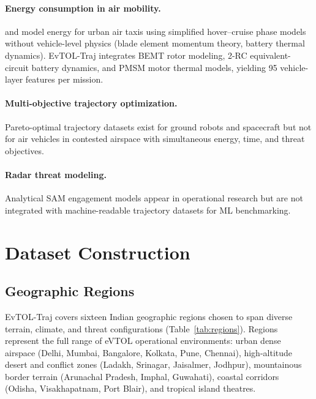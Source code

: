 \documentclass{article}
\begin{document}
\paragraph{Energy consumption in air mobility.}
\citet{rodrigues2021energy} and \citet{nakamura2023energy} model energy
for urban air taxis using simplified hover--cruise phase models without
vehicle-level physics (blade element momentum theory, battery thermal dynamics).
EvTOL-Traj integrates BEMT rotor modeling, 2-RC equivalent-circuit
battery dynamics, and PMSM motor thermal models, yielding 95 vehicle-layer
features per mission.

\paragraph{Multi-objective trajectory optimization.}
Pareto-optimal trajectory datasets exist for ground robots
\citep{gammell2015batch} and spacecraft \citep{raghavendra2021asteroid}
but not for air vehicles in contested airspace with simultaneous energy,
time, and threat objectives.

\paragraph{Radar threat modeling.}
Analytical SAM engagement models appear in operational research
\citep{bodner1994radar,skolnik2008radar} but are not integrated with
machine-readable trajectory datasets for ML benchmarking.

\section{Dataset Construction}
\label{sec:construction}

\subsection{Geographic Regions}
\label{sec:regions}

EvTOL-Traj covers sixteen Indian geographic regions chosen to span diverse
terrain, climate, and threat configurations (Table~\ref{tab:regions}).
Regions represent the full range of eVTOL operational environments: urban
dense airspace (Delhi, Mumbai, Bangalore, Kolkata, Pune, Chennai), high-altitude
desert and conflict zones (Ladakh, Srinagar, Jaisalmer, Jodhpur), mountainous
border terrain (Arunachal Pradesh, Imphal, Guwahati), coastal corridors
(Odisha, Visakhapatnam, Port Blair), and tropical island theatres.
\end{document}
